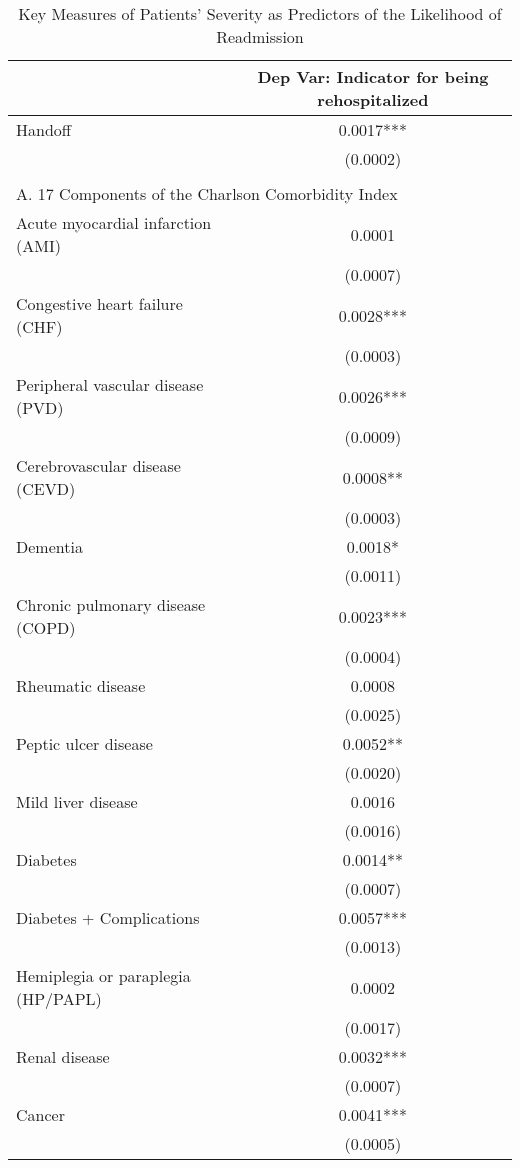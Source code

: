 \documentclass[final,12pt, notitlepage]{article}
\begin{document}
\begin{singlespace}
\begin{table}[H]
\footnotesize
\setlength\tabcolsep{0pt}
\centering
\caption{Key Measures of Patients' Severity as Predictors of the Likelihood of Readmission}
\label{tab:ols_corr_severity}
\begin{threeparttable}
{
\begin{tabular}{lc} \toprule
 & Dep Var: Indicator for being rehospitalized \\
\midrule
Handoff & 0.0017*** \\
 & (0.0002) \\
\\
\multicolumn{2}{l}{A. 17 Components of the Charlson Comorbidity Index}\\
Acute myocardial infarction (AMI) & 0.0001 \\
 & (0.0007) \\
Congestive heart failure (CHF) & 0.0028*** \\
 & (0.0003) \\
Peripheral vascular disease (PVD) & 0.0026*** \\
 & (0.0009) \\
Cerebrovascular disease (CEVD) & 0.0008** \\
 & (0.0003) \\
Dementia & 0.0018* \\
 & (0.0011) \\
Chronic pulmonary disease (COPD) & 0.0023*** \\
 & (0.0004) \\
Rheumatic disease & 0.0008 \\
 & (0.0025) \\
Peptic ulcer disease & 0.0052** \\
 & (0.0020) \\
Mild liver disease & 0.0016 \\
 & (0.0016) \\
Diabetes & 0.0014** \\
 & (0.0007) \\
Diabetes + Complications & 0.0057*** \\
 & (0.0013) \\
Hemiplegia or paraplegia (HP/PAPL) & 0.0002 \\
 & (0.0017) \\
Renal disease & 0.0032*** \\
 & (0.0007) \\
Cancer & 0.0041*** \\
 & (0.0005) \\

\end{tabular}}
\end{threeparttable}
\end{table}
\end{singlespace}
\end{document}
